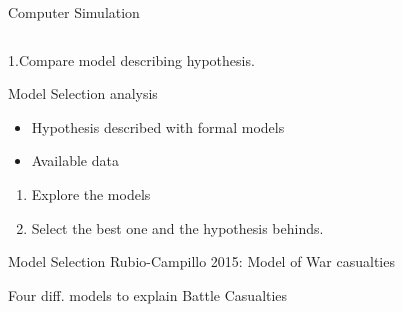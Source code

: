 \documentclass[12pt, notes=show,handout=no]{beamer}
\begin{document}
\begin{frame}{Computer Simulation}
\begin{columns}
\begin{column}{.4\textwidth}
	    
	\end{column}
    \end{columns}
	
\end{frame}


\begin{frame}
    \begin{center}
	1.Compare model describing hypothesis.
    \end{center}
\end{frame}

\begin{frame}{Model Selection analysis}
    \begin{itemize}
	\item<1-> Hypothesis described with formal models
	\item<2-> Available data
    \end{itemize}
    \begin{enumerate}
	\item<4-> Explore the models
	\item<5-> Select the best one and the hypothesis behinds.
    \end{enumerate}

\end{frame}


\begin{frame}{Model Selection}
    Rubio-Campillo 2015:  Model of War casualties
    \begin{center}
    \end{center}
    Four diff. models to explain Battle Casualties
\end{frame}
\end{document}
